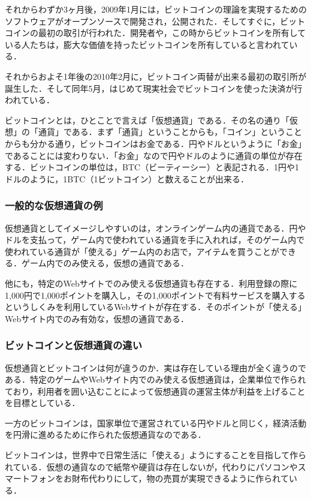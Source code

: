 それからわずか3ヶ月後，2009年1月には，ビットコインの理論を実現するためのソフトウェアがオープンソースで開発され，公開された．そしてすぐに，ビットコインの最初の取引が行われた．開発者や，この時からビットコインを所有している人たちは，膨大な価値を持ったビットコインを所有していると言われている．

それからおよそ1年後の2010年2月に，ビットコイン両替が出来る最初の取引所が誕生した．そして同年5月，はじめて現実社会でビットコインを使った決済が行われている．

ビットコインとは，ひとことで言えば「仮想通貨」である．その名の通り「仮想」の「通貨」である．まず「通貨」ということからも，「コイン」ということからも分かる通り，ビットコインはお金である．円やドルというように「お金」であることには変わりない．「お金」なので円やドルのように通貨の単位が存在する．ビットコインの単位は，BTC（ビーティーシー）と表記される．1円や1ドルのように，1BTC（1ビットコイン）と数えることが出来る．

\subsubsection{一般的な仮想通貨の例}
仮想通貨としてイメージしやすいのは，オンラインゲーム内の通貨である．円やドルを支払って，ゲーム内で使われている通貨を手に入れれば，そのゲーム内で使われている通貨が「使える」ゲーム内のお店で，アイテムを買うことができる．ゲーム内でのみ使える，仮想の通貨である．

他にも，特定のWebサイトでのみ使える仮想通貨も存在する．利用登録の際に1,000円で1,000ポイントを購入し，その1,000ポイントで有料サービスを購入するというしくみを利用しているWebサイトが存在する．そのポイントが「使える」Webサイト内でのみ有効な，仮想の通貨である．

\subsubsection{ビットコインと仮想通貨の違い}
仮想通貨とビットコインは何が違うのか．実は存在している理由が全く違うのである．特定のゲームやWebサイト内でのみ使える仮想通貨は，企業単位で作られており，利用者を囲い込むことによって仮想通貨の運営主体が利益を上げることを目標としている．

一方のビットコインは，国家単位で運営されている円やドルと同じく，経済活動を円滑に進めるために作られた仮想通貨なのである．

ビットコインは，世界中で日常生活に「使える」ようにすることを目指して作られている．仮想の通貨なので紙幣や硬貨は存在しないが，代わりにパソコンやスマートフォンをお財布代わりにして，物の売買が実現できるように作られている．

